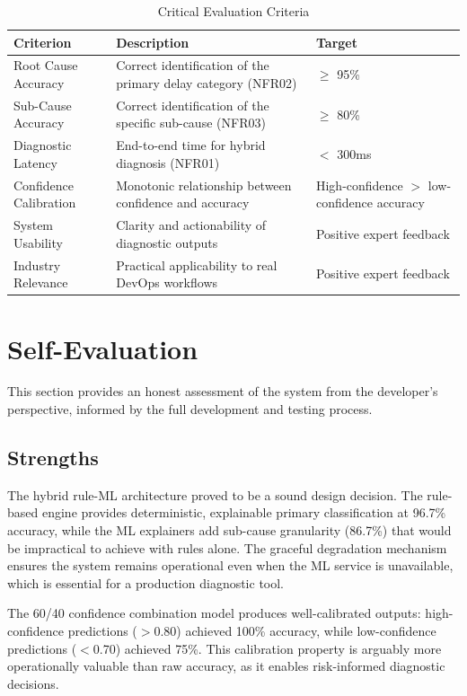 \begin{table}[H]
\centering
\begin{tabularx}{\textwidth}{|l|X|X|}
\hline
\textbf{Criterion} & \textbf{Description} & \textbf{Target} \\ \hline
Root Cause Accuracy & Correct identification of the primary delay category (NFR02) & $\geq$ 95\% \\ \hline
Sub-Cause Accuracy & Correct identification of the specific sub-cause (NFR03) & $\geq$ 80\% \\ \hline
Diagnostic Latency & End-to-end time for hybrid diagnosis (NFR01) & $<$ 300ms \\ \hline
Confidence Calibration & Monotonic relationship between confidence and accuracy & High-confidence $>$ low-confidence accuracy \\ \hline
System Usability & Clarity and actionability of diagnostic outputs & Positive expert feedback \\ \hline
Industry Relevance & Practical applicability to real DevOps workflows & Positive expert feedback \\ \hline
\end{tabularx}
\caption{Critical Evaluation Criteria}
\label{tab:eval_criteria}
\end{table}

\section{Self-Evaluation}
This section provides an honest assessment of the system from the developer's perspective, informed by the full development and testing process.

\subsection{Strengths}
The hybrid rule-ML architecture proved to be a sound design decision. The rule-based engine provides deterministic, explainable primary classification at 96.7\% accuracy, while the ML explainers add sub-cause granularity (86.7\%) that would be impractical to achieve with rules alone. The graceful degradation mechanism ensures the system remains operational even when the ML service is unavailable, which is essential for a production diagnostic tool.

The 60/40 confidence combination model produces well-calibrated outputs: high-confidence predictions ($>$0.80) achieved 100\% accuracy, while low-confidence predictions ($<$0.70) achieved 75\%. This calibration property is arguably more operationally valuable than raw accuracy, as it enables risk-informed diagnostic decisions.

